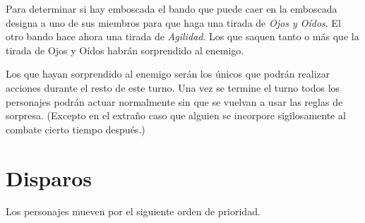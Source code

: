 Para determinar si hay emboscada el bando que puede caer en la emboscada 
designa a uno de sus miembros para que haga una tirada de \emph{Ojos y Oídos}.
El otro bando hace ahora una tirada de \emph{Agilidad}. Los que saquen tanto
o más que la tirada de Ojos y Oídos habrán sorprendido al enemigo.

Los que hayan sorprendido al enemigo serán los únicos que podrán realizar acciones
durante el resto de este turno. Una vez se termine el turno todos los personajes
podrán actuar normalmente sin que se vuelvan a usar las reglas de sorpresa. (Excepto
en el extraño caso que alguien se incorpore sigilosamente al combate cierto tiempo
después.)

\section{Disparos}

Los personajes mueven por el siguiente orden de prioridad.




